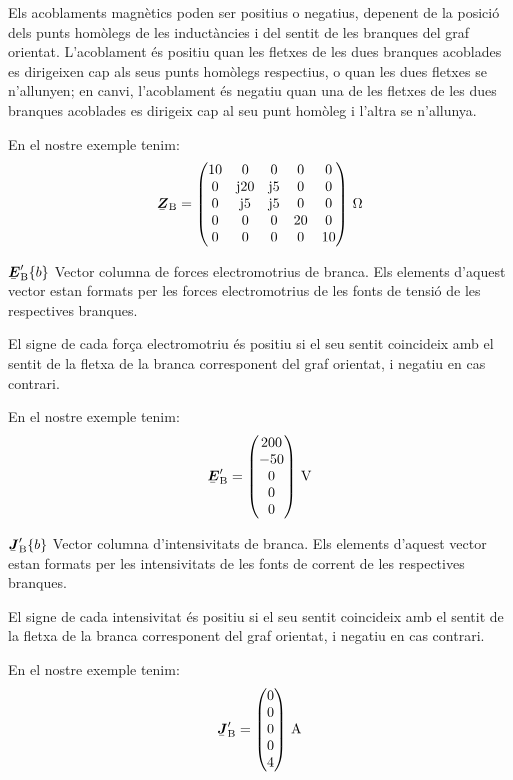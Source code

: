 \begin{list}{}
   Els acoblaments magnètics poden ser positius o negatius, depenent
    de la posició dels punts homòlegs de les inductàncies i del sentit
    de les branques del graf orientat. L'acoblament és positiu quan les
    fletxes de les dues branques acoblades es dirigeixen cap als seus punts
    homòlegs respectius, o quan les dues fletxes se n'allunyen; en canvi,
    l'acoblament és negatiu quan una de les fletxes de les dues branques
    acoblades es dirigeix cap al seu punt homòleg i l'altra se n'allunya.

   En el nostre exemple tenim:
   \[
      \mcmplx{Z}\ped{B} = \begin{pmatrix}
            10 & 0 & 0 & 0 & 0 \\
            0 & \ju 20 & \ju 5 & 0 & 0 \\
            0 & \ju 5 & \ju 5 & 0 & 0 \\
            0 & 0 & 0 & 20 & 0 \\
            0 & 0 & 0 & 0 & 10
      \end{pmatrix}\unit{\,\ohm}
   \]

   \item[$\mcmplx{E}'\ped{B}\{b\}$] Vector columna de forces electromotrius de branca. Els elements d'aquest vector estan formats per les forces electromotrius de les fonts de tensió de les respectives branques.

El signe de cada força electromotriu és positiu si el seu sentit coincideix amb el sentit de la fletxa de la branca corresponent del graf orientat, i negatiu en cas contrari.

   En el nostre exemple tenim:
   \[
      \mcmplx{E}'\ped{B} = \begin{pmatrix} 200 \\ -50 \\ 0 \\ 0 \\ 0 \end{pmatrix}\unit{\,V}
   \]

   \item[$\mcmplx{J}'\ped{B}\{b\}$] Vector columna d'intensivitats de branca. Els elements d'aquest vector estan formats per les intensivitats de les fonts de corrent de les respectives branques.

El signe de cada intensivitat és positiu si el seu sentit coincideix amb el sentit de la fletxa de la branca corresponent del graf orientat, i negatiu en cas contrari.

   En el nostre exemple tenim:
   \[
      \mcmplx{J}'\ped{B} = \begin{pmatrix} 0 \\ 0 \\ 0 \\ 0 \\ 4 \end{pmatrix}\unit{\,A}
   \]

\end{list}

